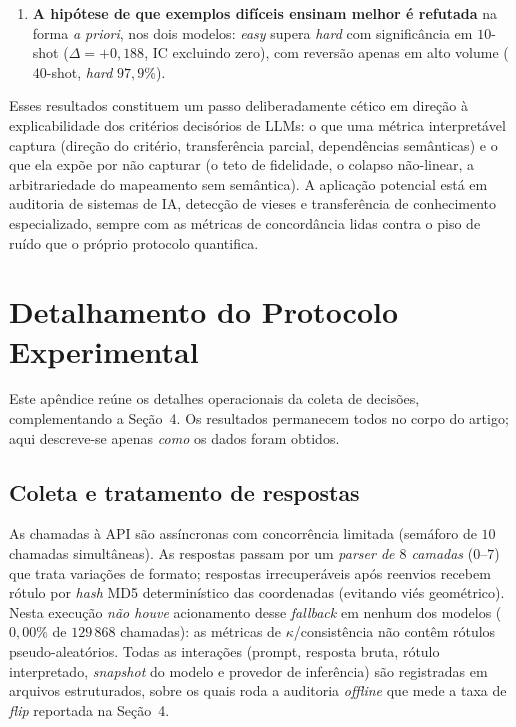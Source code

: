 \documentclass[12pt,a4paper]{article}
\begin{document}
\begin{enumerate}
    $55{,}2\%$ (média sobre três peritos) $\to 97{,}9\%$ no regime linear, sem contudo
    superar de forma consistente a Regressão Logística
    ($97$–$98\%$); no regime não-linear sintético o zero-shot do \texttt{gpt-4o-mini}
    \emph{colapsa} em classe única em duas das três sementes (o
    \texttt{gemini-2.5-flash-lite} não colapsa), enquanto na base real, com exemplos, o LLM
    iguala ou supera o Perceptron \emph{baseline} na maioria dos $n$-shot ($\approx 87\%$).
  \item \textbf{A hipótese de que exemplos difíceis ensinam melhor é refutada} na forma
    \emph{a priori}, nos dois modelos: \emph{easy} supera \emph{hard} com significância em
    $10$-shot ($\Delta = +0{,}188$, IC excluindo zero), com reversão apenas em alto volume
    ($40$-shot, \emph{hard} $97{,}9\%$).
\end{enumerate}

Esses resultados constituem um passo deliberadamente cético em direção à explicabilidade
dos critérios decisórios de LLMs: o que uma métrica interpretável captura (direção do
critério, transferência parcial, dependências semânticas) e o que ela expõe por não
capturar (o teto de fidelidade, o colapso não-linear, a arbitrariedade do mapeamento sem
semântica). A aplicação potencial está em auditoria de sistemas de IA, detecção de vieses e
transferência de conhecimento especializado, sempre com as métricas de concordância lidas
contra o piso de ruído que o próprio protocolo quantifica.

\appendix

\section{Detalhamento do Protocolo Experimental}
\label{ap:protocolo}

Este apêndice reúne os detalhes operacionais da coleta de decisões, complementando a
Seção~4. Os resultados permanecem todos no corpo do artigo; aqui
descreve-se apenas \emph{como} os dados foram obtidos.

\subsection{Coleta e tratamento de respostas}

As chamadas à API são assíncronas com concorrência limitada (semáforo de $10$ chamadas
simultâneas). As respostas passam por um \emph{parser
de $8$ camadas} ($0$–$7$) que trata variações de formato; respostas irrecuperáveis após
reenvios recebem rótulo por \emph{hash} MD5 determinístico das coordenadas (evitando viés
geométrico). Nesta execução \emph{não houve} acionamento desse \emph{fallback} em nenhum dos
modelos ($0{,}00\%$ de $129\,868$ chamadas): as métricas de $\kappa$/consistência não contêm
rótulos pseudo-aleatórios. Todas as interações (prompt, resposta bruta, rótulo
interpretado, \emph{snapshot} do modelo e provedor de inferência) são registradas em
arquivos estruturados, sobre os quais roda a auditoria \emph{offline} que mede a taxa de
\emph{flip} reportada na Seção~4.
\end{document}

